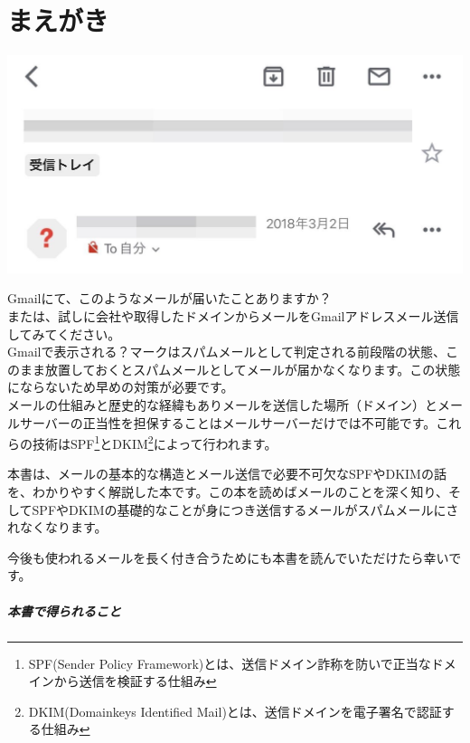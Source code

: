 \chapter{まえがき}
\label{chap:chap00-preface}
\begin{reviewimage}%
\includegraphics[width=\maxwidth]{./images/chap00-preface/gmail.png}%
\label{image:chap00-preface:gmail}
\end{reviewimage}

Gmailにて、このようなメールが届いたことありますか？\\
または、試しに会社や取得したドメインからメールをGmailアドレスメール送信してみてください。\\
Gmailで表示される？マークはスパムメールとして判定される前段階の状態、このまま放置しておくとスパムメールとしてメールが届かなくなります。この状態にならないため早めの対策が必要です。\\
メールの仕組みと歴史的な経緯もありメールを送信した場所（ドメイン）とメールサーバーの正当性を担保することはメールサーバーだけでは不可能です。これらの技術はSPF\footnote{SPF(Sender Policy Framework)とは、送信ドメイン詐称を防いで正当なドメインから送信を検証する仕組み}とDKIM\footnote{DKIM(Domainkeys Identified Mail)とは、送信ドメインを電子署名で認証する仕組み}によって行われます。

本書は、メールの基本的な構造とメール送信で必要不可欠なSPFやDKIMの話を、わかりやすく解説した本です。この本を読めばメールのことを深く知り、そしてSPFやDKIMの基礎的なことが身につき送信するメールがスパムメールにされなくなります。

今後も使われるメールを長く付き合うためにも本書を読んでいただけたら幸いです。

\paragraph*{本書で得られること}
\label{sec:-0-0-0-1}

